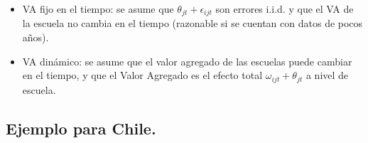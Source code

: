 \documentclass[11pt]{article}
\numberwithin{equation}{section}
\begin{document}
\begin{itemize} 

\item VA fijo en el tiempo: se asume que $\theta_{jt}+\epsilon_{ijt}$ son errores i.i.d. y que el VA de la escuela no cambia en el tiempo (razonable si se cuentan con datos de pocos a\~nos).

\item VA din\'amico: se asume que el valor agregado de las escuelas puede cambiar en el tiempo, y que el Valor Agregado es el efecto total $\omega_{ijt} + \theta_{jt}$ a nivel de escuela.

\end{itemize}



\subsection*{\bf Ejemplo para Chile.} 
\end{document}
